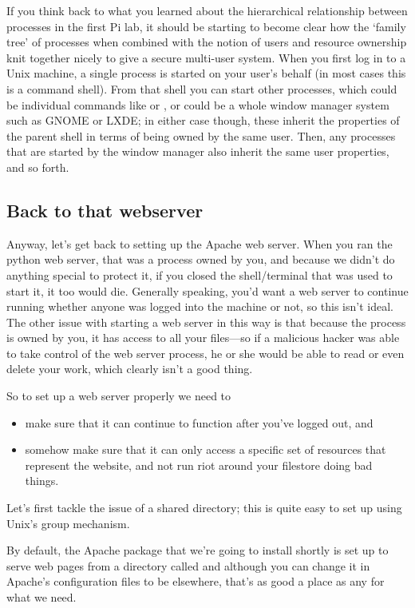 If you think back to what you learned about the hierarchical relationship between processes in the first Pi lab, it should be starting to become clear how the `family tree' of processes when combined with the notion of users and resource ownership knit together nicely to give a secure multi-user system. When you first log in to a Unix machine, a single process is started on your user's behalf (in most cases this is a command shell). From that shell you can start other processes, which could be individual commands like  or , or could be a whole window manager system such as GNOME or LXDE; in either case though, these inherit the properties of the parent shell in terms of being owned by the same user. Then, any processes that are started by the window manager also inherit the same user properties, and so forth. 

\subsection{Back to that webserver}

Anyway, let's get back to setting up the Apache web server. When you ran the python web server, that was a process owned by you, and because we didn't do anything special to protect it, if you closed the shell/terminal that was used to start it, it too would die. Generally speaking, you'd want a web server to continue running whether anyone was logged into the machine or not, so this isn't ideal. The other issue with starting a web server in this way is that because the process is owned by you, it has access to all your files---so if a malicious hacker was able to take control of the web server process, he or she would be able to read or even delete your work, which clearly isn't a good thing. 

So to set up a web server properly we need to

\begin{itemize}
\item make sure that it can continue to function after you've logged out, and
\item somehow make sure that it can only access a specific set of resources that represent the website, and not run riot around your filestore doing bad things. 
\end{itemize}

Let's first tackle the issue of a shared directory; this is quite easy to set up using Unix's group mechanism. 

By default, the Apache package that we're going to install shortly is set up to serve web pages from a directory called  and although you can change it in Apache's configuration files to be elsewhere, that's as good a place as any for what we need. 

